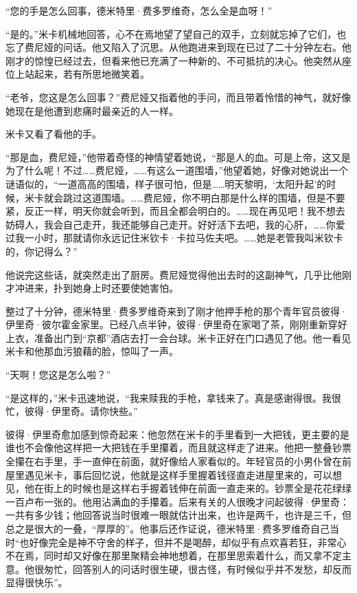\par “您的手是怎么回事，德米特里·费多罗维奇，怎么全是血呀！”
\par “是的。”米卡机械地回答，心不在焉地望了望自己的双手，立刻就忘掉了它们，也忘了费尼娅的问话。他又陷入了沉思。从他跑进来到现在已过了二十分钟左右。他刚才的惊惶已经过去，但看来他已充满了一种新的、不可抵抗的决心。他突然从座位上站起来，若有所思地微笑着。
\par “老爷，您这是怎么回事？”费尼娅又指着他的手问，而且带着怜惜的神气，就好像她现在是他遭到悲痛时最亲近的人一样。
\par 米卡又看了看他的手。
\par “那是血，费尼娅，”他带着奇怪的神情望着她说，“那是人的血。可是上帝，这又是为了什么呢！不过……费尼娅，……有这么一道围墙，”他望着她，好像对她说出一个谜语似的，“一道高高的围墙，样子很可怕，但是……明天黎明，‘太阳升起’的时候，米卡就会跳过这道围墙。……费尼娅，你不明白那是什么样的围墙，但是不要紧，反正一样，明天你就会听到，而且全都会明白的。……现在再见吧！我不想去妨碍人，我会自己走开，我还能够自己走开。好好活下去吧，我的心肝，……你爱过我一小时，那就请你永远记住米钦卡·卡拉马佐夫吧。……她是老管我叫米钦卡的，你记得么？”
\par 他说完这些话，就突然走出了厨房。费尼娅觉得他出去时的这副神气，几乎比他刚才冲进来，扑到她身上时还要使她害怕。
\par 整过了十分钟，德米特里·费多罗维奇来到了刚才他押手枪的那个青年官员彼得·伊里奇·彼尔霍金家里。已经八点半钟，彼得·伊里奇在家喝了茶，刚刚重新穿好上衣，准备出门到“京都”酒店去打一会台球。米卡正好在门口遇见了他。他一看见米卡和他那血污狼藉的脸，惊叫了一声。
\par “天啊！您这是怎么啦？”
\par “是这样的，”米卡迅速地说，“我来赎我的手枪，拿钱来了。真是感谢得很。我很忙，彼得·伊里奇。请你快些。”
\par 彼得·伊里奇愈加感到惊奇起来：他忽然在米卡的手里看到一大把钱，更主要的是谁也不会像他这样把一大把钱在手里攥着，而且就这样走了进来。他把一整叠钞票全攥在右手里，手一直伸在前面，就好像给人家看似的。年轻官员的小男仆曾在前屋里遇见米卡，事后回忆说，他就是这样手里握着钱径直走进屋里来的，可以想见，他在街上的时候也是这样右手握着钱伸在前面一直走来的。钞票全是花花绿绿一百卢布一张的。他用沾满血的手攥着。后来有关的人很晚才问起彼得·伊里奇：一共有多少钱；他回答说当时很难一眼就估计出来，也许是两千，也许是三千，但总之是很大的一叠，“厚厚的”。他事后还作证说，德米特里·费多罗维奇自己当时“也好像完全是神不守舍的样子，但并不是喝醉，却似乎有点欢喜若狂，非常心不在焉，同时却又好像在那里聚精会神地想着，在那里思索着什么，而又拿不定主意。他很匆忙，回答别人的问话时很生硬，很古怪，有时候似乎并不发愁，却反而显得很快乐”。
